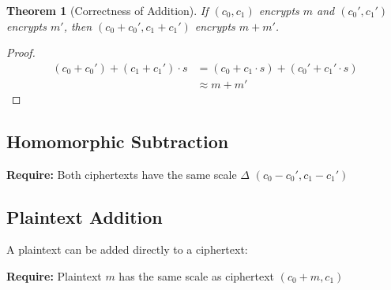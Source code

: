 \documentclass[11pt,a4paper]{article}
\newtheorem{theorem}{Theorem}
\begin{document}
\begin{theorem}[Correctness of Addition]
If $(c_0, c_1)$ encrypts $m$ and $(c_0', c_1')$ encrypts $m'$, then $(c_0 + c_0', c_1 + c_1')$ encrypts $m + m'$.
\end{theorem}

\begin{proof}
\begin{align*}
(c_0 + c_0') + (c_1 + c_1') \cdot s &= (c_0 + c_1 \cdot s) + (c_0' + c_1' \cdot s) \\
&\approx m + m'
\end{align*}
\end{proof}

\subsection{Homomorphic Subtraction}

\begin{algorithm}[H]
\caption{Homomorphic Subtraction}
\begin{algorithmic}[1]
    \State \textbf{Require:} Both ciphertexts have the same scale $\Delta$
    \State \Return $(c_0 - c_0', c_1 - c_1')$
\EndFunction
\end{algorithmic}
\end{algorithm}

\subsection{Plaintext Addition}

A plaintext can be added directly to a ciphertext:

\begin{algorithm}[H]
\caption{Plaintext Addition}
\begin{algorithmic}[1]
    \State \textbf{Require:} Plaintext $m$ has the same scale as ciphertext
    \State \Return $(c_0 + m, c_1)$
\EndFunction
\end{algorithmic}
\end{algorithm}

\end{document}
